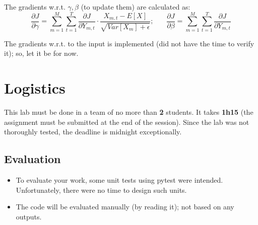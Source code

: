\documentclass{../../../extra/aakpract/aakpract}
\begin{document}
The gradients w.r.t. $\gamma, \beta$ (to update them) are calculated as:
\begin{equation}
	\frac{\partial J}{\partial \gamma} = \sum_{m=1}^{M} \sum_{t=1}^{T} \frac{\partial J}{\partial Y_{m,t}} \cdot \frac{X_{m,t} - E[X]}{\sqrt{Var[X_{m}] + \epsilon}};
	\ \ \ \ \ \ \ \
	\frac{\partial J}{\partial \beta} = \sum_{m=1}^{M} \sum_{t=1}^{T} \frac{\partial J}{\partial Y_{m,t}}
\end{equation}

The gradients w.r.t. to the input is implemented (did not have the time to verify it); so, let it be for now.

%
%

\section{Logistics}

This lab must be done in a team of no more than \textbf{2} students.
It takes \textbf{1h15} (the assignment must be submitted at the end of the session).
Since the lab was not thoroughly tested, the deadline is midnight exceptionally.

\subsection{Evaluation}

\begin{itemize}
	\item To evaluate your work, some unit tests using pytest were intended. 
	Unfortunately, there were no time to design such units.
	\item The code will be evaluated manually (by reading it); not based on any outputs.
\end{itemize}
\end{document}
